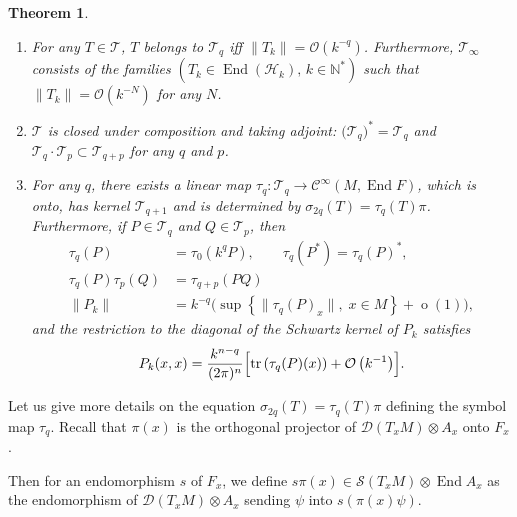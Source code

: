 \documentclass[10pt,a4paper]{article}
\newtheorem{theo}{Theorem}[section]
\theoremstyle{definition}
\numberwithin{equation}{section}
\newcommand{\N}{{\mathbb{N}}}
\newcommand{\si}{{\sigma}}
\newcommand{\op}{\operatorname}
\newcommand{\Ci}{{\mathcal{C}}^{\infty}}
\newcommand{\bigo}{\mathcal{O}}
\newcommand{\D}{\mathcal{D}}
\newcommand{\symb}{\mathcal{S}}
\newcommand{\Hilb}{\mathcal{H}}
\newcommand{\clT}{\mathcal{T}}
\begin{document}
\begin{theo}\label{theo:toeplitz}\leavevmode
\begin{enumerate}
\item\label{theo3.2.1} For any $T \in \clT $, $T$ belongs to $\clT_q $ iff $\| T_k \| = \bigo (k^{-q})$. Furthermore, $\clT_{\infty}$ consists of the families $(T_k \in \op{End} (\Hilb_k), \, k \in \N^*)$ such that $\| T_k \| = \bigo(k^{-N})$ for any $N$.
\item\label{theo3.2.2} $ \clT $ is closed under composition and taking adjoint: $ \bigl(\clT_q \bigr)^* = \clT_q$ and $\clT_q \cdot \clT_p \subset \clT_{q+p} $ for any $q$ and $p$.
\item\label{theo3.2.3} For any $q$, there exists a linear map $\tau_q : \clT_q \rightarrow
\Ci (M, \op{End} F) $, which is onto, has kernel $\clT_{q+1} $ and is determined by $\si_{2q} (T) = \tau_q(T)
\pi$. Furthermore, if $P \in \clT_q $ and $Q \in
\clT_p $, then
\begin{equation}
\begin{split}  \tau_q(P) &= \tau_0(k^{q}P), \qquad \tau_q(P ^*) =
\tau_q(P)^*, \\ 
\tau_q (P) \tau_p(Q) &= \tau_{q+p} (PQ) \\
 \| P_k \| &= k^{-q} \bigl(\sup \left\{ \| \tau_q (P)_x \|, \; x \in M \right\} + \op{o} (1) \bigr),
\end{split}
\end{equation}
and the restriction to the diagonal of the Schwartz kernel of $P_k$ satisfies
\begin{gather}\label{eq:trace_diag}
P_k (x,x) = \frac{k^{n-q}}{(2\pi)^n} \Bigl[\op{tr} \left(\tau_q (P) (x)\right) +
\bigo \left(k^{-1}\right) \Bigr].
\end{gather}
\end{enumerate}
\end{theo}

Let us give more details on the equation $\si_{2q} (T) = \tau_q(T)
\pi$ defining the symbol map $\tau_q$. Recall that $\pi(x)$ is the orthogonal projector of $\D (T_xM) \otimes A_x$ onto $F_x$.

Then for an endomorphism $s$ of $F_x$, we define $s
\pi(x) \in \symb (T_xM) \otimes \op{End} A_x $ as the endomorphism of $\D (T_xM) \otimes A_x$ sending $\psi $ into $s (\pi(x) \psi)$.
\end{document}
